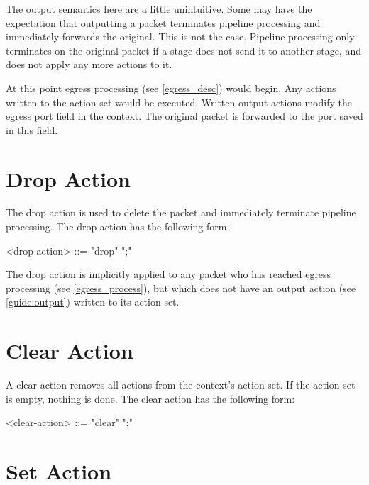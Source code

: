 The output semantics here are a little unintuitive. Some may have the expectation that outputting a packet terminates pipeline processing and immediately forwards the original. This is not the case. Pipeline processing only terminates on the original packet if a stage does not send it to another stage, and does not apply any more actions to it. 

At this point egress processing (see \ref{egress_desc}) would begin. Any actions written to the action set would be executed. Written output actions modify the egress port field in the context. The original packet is forwarded to the port saved in this field.

\section{Drop Action} \label{guide:drop}

The drop action is used to delete the packet and immediately terminate pipeline processing. The drop action has the following form:

\begin{minip}
\begin{grammar}
<drop-action> ::= "drop" ";"
\end{grammar}
\end{minip}

The drop action is implicitly applied to any packet who has reached egress processing (see \ref{egress_process}), but which does not have an output action (see \ref{guide:output}) written to its action set.

\section{Clear Action} \label{guide:clear}

A clear action removes all actions from the context's action set. If the action set is empty, nothing is done. The clear action has the following form:

\begin{minip}
\begin{grammar}
<clear-action> ::= "clear" ";"
\end{grammar}
\end{minip}

\section{Set Action} \label{guide:set_field}

